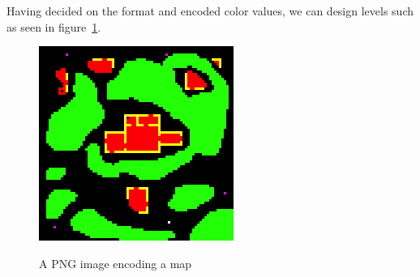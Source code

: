Having decided on the format and encoded color values, we can design levels
such as seen in figure~\ref{fig:png_map}.

\begin{figure}[H]
    \centering
    \includegraphics{figures/generating_levels/map.png}
    \label{fig:png_map}
    \caption{A PNG image encoding a map}
\end{figure}

